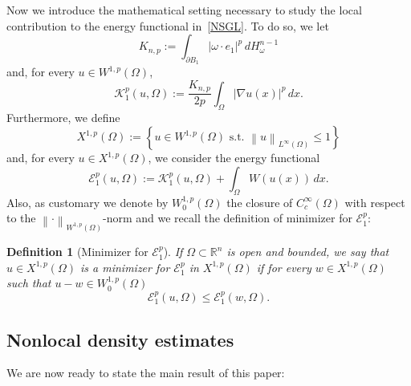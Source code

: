 \documentclass[12pt]{article}
\newcommand{\R}{\mathbb{R}}
\numberwithin{equation}{section}
\newtheorem{defn}[thm]{Definition}
\renewcommand{\leq}{\leqslant}
\begin{document}
Now we introduce the mathematical setting necessary to study the local contribution to the energy functional in~\eqref{NSGL}. To do so, we let
\begin{equation*}
K_{n,p}:=\int_{\partial B_1}\left|\omega\cdot e_1\right|^p\,dH_{\omega}^{n-1}
\end{equation*}
and, for every $u\in W^{1,p}(\Omega)$,
\begin{equation*}
\mathcal{K}_1^p(u,\Omega):=\frac{K_{n,p}}{2p}\int_{\Omega} \left|\nabla u (x)\right|^p\,dx.
\end{equation*}
Furthermore, we define
\begin{equation*} 
X^{1,p}(\Omega):=\left\lbrace u\in W^{1,p}(\Omega)\mbox{  s.t.  }\left\| u\right\|_{L^\infty(\Omega)}\leq 1 \right\rbrace
\end{equation*}
and, for every $u \in X^{1,p}(\Omega)$, we consider the energy functional
\begin{equation}\label{localene}
\mathcal{E}_1^p(u,\Omega):=\mathcal{K}_1^p(u,\Omega)+\int_{\Omega}W(u(x))\,dx.
\end{equation}
Also, as customary we denote by $W_0^{1,p}(\Omega)$ the closure of $C_c^\infty(\Omega)$ with respect to the  $\left\|\cdot\right\|_{W^{1,p}(\Omega)}$-norm and we recall the definition of minimizer for $\mathcal{E}_1^p$: 
\begin{defn}[Minimizer for $\mathcal{E}_1^p$]
If $\Omega\subset\R^n$ is open and bounded, we say that $u\in X^{1,p}(\Omega)$ is a minimizer for $\mathcal{E}_1^p$ in $X^{1,p}(\Omega)$ if for every $w\in X^{1,p}(\Omega)$ such that $u-w\in W_0^{1,p}(\Omega)$ 
\begin{equation*}
\mathcal{E}_1^p(u,\Omega)\leq \mathcal{E}_1^p(w,\Omega). 
\end{equation*} 
\end{defn}

\subsection{Nonlocal density estimates}
We are now ready to state the main result of this paper: 
\end{document}
